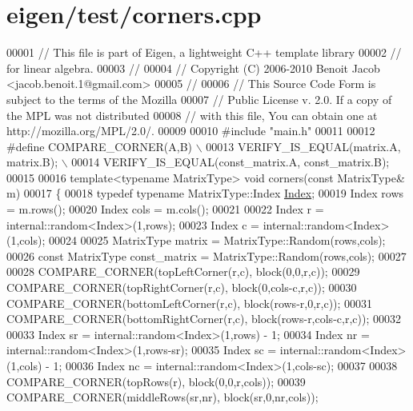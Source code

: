 \hypertarget{eigen_2test_2corners_8cpp_source}{}\section{eigen/test/corners.cpp}
\label{eigen_2test_2corners_8cpp_source}

\begin{DoxyCode}
00001 \textcolor{comment}{// This file is part of Eigen, a lightweight C++ template library}
00002 \textcolor{comment}{// for linear algebra.}
00003 \textcolor{comment}{//}
00004 \textcolor{comment}{// Copyright (C) 2006-2010 Benoit Jacob <jacob.benoit.1@gmail.com>}
00005 \textcolor{comment}{//}
00006 \textcolor{comment}{// This Source Code Form is subject to the terms of the Mozilla}
00007 \textcolor{comment}{// Public License v. 2.0. If a copy of the MPL was not distributed}
00008 \textcolor{comment}{// with this file, You can obtain one at http://mozilla.org/MPL/2.0/.}
00009 
00010 \textcolor{preprocessor}{#include "main.h"}
00011 
00012 \textcolor{preprocessor}{#define COMPARE\_CORNER(A,B) \(\backslash\)}
00013 \textcolor{preprocessor}{  VERIFY\_IS\_EQUAL(matrix.A, matrix.B); \(\backslash\)}
00014 \textcolor{preprocessor}{  VERIFY\_IS\_EQUAL(const\_matrix.A, const\_matrix.B);}
00015 
00016 \textcolor{keyword}{template}<\textcolor{keyword}{typename} MatrixType> \textcolor{keywordtype}{void} corners(\textcolor{keyword}{const} MatrixType& m)
00017 \{
00018   \textcolor{keyword}{typedef} \textcolor{keyword}{typename} MatrixType::Index \hyperlink{namespace_eigen_a62e77e0933482dafde8fe197d9a2cfde}{Index};
00019   Index rows = m.rows();
00020   Index cols = m.cols();
00021 
00022   Index r = internal::random<Index>(1,rows);
00023   Index c = internal::random<Index>(1,cols);
00024 
00025   MatrixType matrix = MatrixType::Random(rows,cols);
00026   \textcolor{keyword}{const} MatrixType const\_matrix = MatrixType::Random(rows,cols);
00027 
00028   COMPARE\_CORNER(topLeftCorner(r,c), block(0,0,r,c));
00029   COMPARE\_CORNER(topRightCorner(r,c), block(0,cols-c,r,c));
00030   COMPARE\_CORNER(bottomLeftCorner(r,c), block(rows-r,0,r,c));
00031   COMPARE\_CORNER(bottomRightCorner(r,c), block(rows-r,cols-c,r,c));
00032 
00033   Index sr = internal::random<Index>(1,rows) - 1;
00034   Index nr = internal::random<Index>(1,rows-sr);
00035   Index sc = internal::random<Index>(1,cols) - 1;
00036   Index nc = internal::random<Index>(1,cols-sc);
00037 
00038   COMPARE\_CORNER(topRows(r), block(0,0,r,cols));
00039   COMPARE\_CORNER(middleRows(sr,nr), block(sr,0,nr,cols));

\end{DoxyCode}
